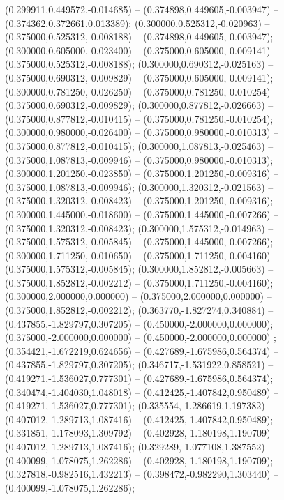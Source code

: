  (0.299911,0.449572,-0.014685) -- (0.374898,0.449605,-0.003947) -- (0.374362,0.372661,0.013389);
 (0.300000,0.525312,-0.020963) -- (0.375000,0.525312,-0.008188) -- (0.374898,0.449605,-0.003947);
 (0.300000,0.605000,-0.023400) -- (0.375000,0.605000,-0.009141) -- (0.375000,0.525312,-0.008188);
 (0.300000,0.690312,-0.025163) -- (0.375000,0.690312,-0.009829) -- (0.375000,0.605000,-0.009141);
 (0.300000,0.781250,-0.026250) -- (0.375000,0.781250,-0.010254) -- (0.375000,0.690312,-0.009829);
 (0.300000,0.877812,-0.026663) -- (0.375000,0.877812,-0.010415) -- (0.375000,0.781250,-0.010254);
 (0.300000,0.980000,-0.026400) -- (0.375000,0.980000,-0.010313) -- (0.375000,0.877812,-0.010415);
 (0.300000,1.087813,-0.025463) -- (0.375000,1.087813,-0.009946) -- (0.375000,0.980000,-0.010313);
 (0.300000,1.201250,-0.023850) -- (0.375000,1.201250,-0.009316) -- (0.375000,1.087813,-0.009946);
 (0.300000,1.320312,-0.021563) -- (0.375000,1.320312,-0.008423) -- (0.375000,1.201250,-0.009316);
 (0.300000,1.445000,-0.018600) -- (0.375000,1.445000,-0.007266) -- (0.375000,1.320312,-0.008423);
 (0.300000,1.575312,-0.014963) -- (0.375000,1.575312,-0.005845) -- (0.375000,1.445000,-0.007266);
 (0.300000,1.711250,-0.010650) -- (0.375000,1.711250,-0.004160) -- (0.375000,1.575312,-0.005845);
 (0.300000,1.852812,-0.005663) -- (0.375000,1.852812,-0.002212) -- (0.375000,1.711250,-0.004160);
 (0.300000,2.000000,0.000000) -- (0.375000,2.000000,0.000000) -- (0.375000,1.852812,-0.002212);
 (0.363770,-1.827274,0.340884) -- (0.437855,-1.829797,0.307205) -- (0.450000,-2.000000,0.000000);
 (0.375000,-2.000000,0.000000) -- (0.450000,-2.000000,0.000000) ;
 (0.354421,-1.672219,0.624656) -- (0.427689,-1.675986,0.564374) -- (0.437855,-1.829797,0.307205);
 (0.346717,-1.531922,0.858521) -- (0.419271,-1.536027,0.777301) -- (0.427689,-1.675986,0.564374);
 (0.340474,-1.404030,1.048018) -- (0.412425,-1.407842,0.950489) -- (0.419271,-1.536027,0.777301);
 (0.335554,-1.286619,1.197382) -- (0.407012,-1.289713,1.087416) -- (0.412425,-1.407842,0.950489);
 (0.331851,-1.178093,1.309792) -- (0.402928,-1.180198,1.190709) -- (0.407012,-1.289713,1.087416);
 (0.329289,-1.077108,1.387552) -- (0.400099,-1.078075,1.262286) -- (0.402928,-1.180198,1.190709);
 (0.327818,-0.982516,1.432213) -- (0.398472,-0.982290,1.303440) -- (0.400099,-1.078075,1.262286);

